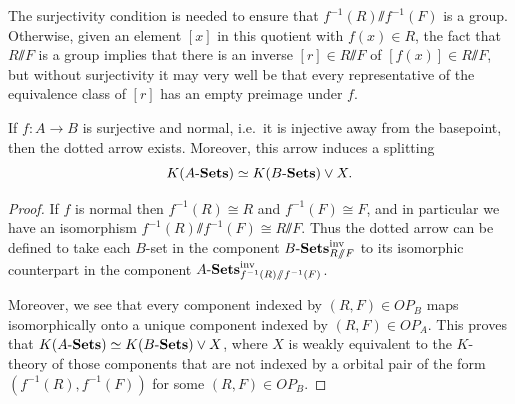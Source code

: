 \documentclass[11pt]{amsart}
\renewcommand{\ss}{\mathord{\sslash}}
\begin{document}
\begin{remark}
  The surjectivity condition is needed to ensure that $f^{-1}(R)\ss f^{-1}(F)$ is a group. Otherwise, given an element $[x]$ in this quotient with $f(x)\in R$, the fact that $R\ss F$ is a group implies that there is an inverse $[r]\in R\ss F$ of $[f(x)]\in R\ss F$, but without surjectivity it may very well be that every representative of the equivalence class of $[r]$ has an empty preimage under $f$.
\end{remark}


\begin{proposition} \label{transport}
    If $f:A\to B$ is surjective and normal, i.e.\ it is injective away from the basepoint, then the dotted arrow exists.  Moreover, this arrow induces a splitting $$K(A\text{-}\mathbf{Sets}) \simeq K(B\text{-}\mathbf{Sets}) \vee X.$$
\end{proposition}

\begin{proof}
    If $f$ is normal then $f^{-1}(R) \cong R$ and $f^{-1}(F) \cong F$, and in particular %
    we have an isomorphism $f^{-1}(R) \ss f^{-1}(F) \cong R \ss F$. Thus the dotted arrow can be defined to take each $B$-set in the component $\BSets^\inv_{R \ss F}$ to its isomorphic counterpart in the component $\ASets^\inv_{f^{-1}(R)\ss f^{-1}(F)}$.

    Moreover, we see that every component indexed by $(R,F)\in OP_B$ maps isomorphically onto a unique component indexed by $(R,F) \in OP_A$.  This proves that $K(A\text{-}\mathbf{Sets}) \simeq K(B\text{-}\mathbf{Sets}) \vee X$, where $X$ is weakly equivalent to the $K$-theory of those components  that are not indexed by a orbital pair of the form $(f^{-1}(R), f^{-1}(F))$ for some $(R,F)\in OP_B$.
\end{proof}


\end{document}
